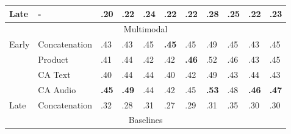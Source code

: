\documentclass{article}
\begin{document}
\begin{table}[H]
\begin{tabular}{|lllllllllll|}
\multicolumn{1}{|l|}{Late}                   & \multicolumn{1}{l|}{-}             & .20                & .22                & .24                & .22                & .22                & .28                & .25                & \multicolumn{1}{l|}{.22}                & .23                   \\ \hline
\multicolumn{11}{|c|}{Multimodal}                                                                                                                                                                                                                                                                      \\ \hline
\multicolumn{1}{|l|}{\multirow{4}{*}{Early}} & \multicolumn{1}{l|}{Concatenation} & .43                & .43                & .45                & \textbf{.45}       & .45                & .49                & .45                & \multicolumn{1}{l|}{.43}                & .45                   \\
\multicolumn{1}{|l|}{}                       & \multicolumn{1}{l|}{Product}       & .41                & .44                & .42                & .42                & \textbf{.46}       & .52                & .46                & \multicolumn{1}{l|}{.43}                & .45                   \\
\multicolumn{1}{|l|}{}                       & \multicolumn{1}{l|}{CA Text}       & .40                & .44                & .44                & .40                & .42                & .49                & .43                & \multicolumn{1}{l|}{.44}                & .43                   \\
\multicolumn{1}{|l|}{}                       & \multicolumn{1}{l|}{CA Audio}      & \textbf{.45}       & \textbf{.49}       & .44                & .42                & .45                & \textbf{.53}       & .48                & \multicolumn{1}{l|}{\textbf{.46}}       & \textbf{.47}          \\
\multicolumn{1}{|l|}{Late}                   & \multicolumn{1}{l|}{Concatenation} & .32                & .28                & .31                & .27                & .29                & .31                & .35                & \multicolumn{1}{l|}{.30}                & .30                   \\ \hline
\multicolumn{11}{|c|}{Baselines}                                                                                                                                                                                                                                                                       \\ \hline

\end{tabular}
\end{table}
\end{document}

